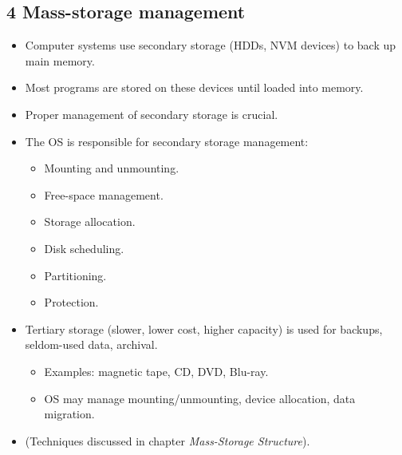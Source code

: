 \documentclass{article}
\begin{document}
\subsection*{4 Mass-storage management}
\begin{itemize}
    \item Computer systems use secondary storage (HDDs, NVM devices) to back up main memory.
    \item Most programs are stored on these devices until loaded into memory.
    \item Proper management of secondary storage is crucial.
    \item The OS is responsible for secondary storage management:
    \begin{itemize}
        \item Mounting and unmounting.
        \item Free-space management.
        \item Storage allocation.
        \item Disk scheduling.
        \item Partitioning.
        \item Protection.
    \end{itemize}
    \item Tertiary storage (slower, lower cost, higher capacity) is used for backups, seldom-used data, archival.
    \begin{itemize}
        \item Examples: magnetic tape, CD, DVD, Blu-ray.
        \item OS may manage mounting/unmounting, device allocation, data migration.
    \end{itemize}
    \item (Techniques discussed in chapter \textit{Mass-Storage Structure}).
\end{itemize}
\end{document}
